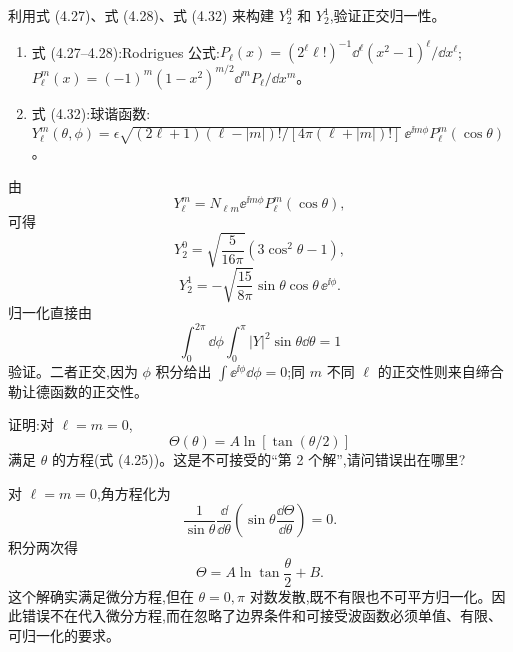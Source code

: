 \begin{question}
利用式 (4.27)、式 (4.28)、式 (4.32) 来构建 $Y_2^0$ 和 $Y_2^1$,验证正交归一性。

\par\smallskip
{}
\begin{enumerate}[leftmargin=2.2em,itemsep=0.12em,topsep=0.12em,parsep=0pt]
\item 式 (4.27--4.28):Rodrigues 公式:$P_\ell(x)=(2^\ell\ell!)^{-1}\dd^\ell(x^2-1)^\ell/\dd x^\ell$;$P_\ell^m(x)=(-1)^m(1-x^2)^{m/2}\dd^mP_\ell/\dd x^m$。
\item 式 (4.32):球谐函数:$Y_\ell^m(\theta,\phi)=\epsilon\sqrt{(2\ell+1)(\ell-|m|)!/[4\pi(\ell+|m|)!]}\,\ee^{\ii m\phi}P_\ell^m(\cos\theta)$。
\end{enumerate}

\begin{solution}

由
\[
Y_\ell^m=N_{\ell m}\ee^{\ii m\phi}P_\ell^m(\cos\theta),
\]
可得
\[
Y_2^0=\sqrt{\frac{5}{16\pi}}(3\cos^2\theta-1),
\]
\[
Y_2^1=-\sqrt{\frac{15}{8\pi}}\sin\theta\cos\theta\,\ee^{\ii\phi}.
\]
归一化直接由
\[
\int_0^{2\pi}\!\dd\phi\int_0^\pi |Y|^2\sin\theta\dd\theta=1
\]
验证。二者正交,因为 $\phi$ 积分给出 $\int \ee^{\ii\phi}\dd\phi=0$;同 $m$ 不同 $\ell$ 的正交性则来自缔合勒让德函数的正交性。

\end{solution}
\end{question}

\begin{question}
证明:对 $\ell=m=0$,
\[
\Theta(\theta)=A\ln[\tan(\theta/2)]
\]
满足 $\theta$ 的方程(式 (4.25))。这是不可接受的“第 2 个解”,请问错误出在哪里?

\par\smallskip
{}

\begin{solution}

对 $\ell=m=0$,角方程化为
\[
\frac{1}{\sin\theta}\frac{\dd}{\dd\theta}\left(\sin\theta\frac{\dd\Theta}{\dd\theta}\right)=0.
\]
积分两次得
\[
\Theta=A\ln\tan\frac{\theta}{2}+B.
\]
这个解确实满足微分方程,但在 $\theta=0,\pi$ 对数发散,既不有限也不可平方归一化。因此错误不在代入微分方程,而在忽略了边界条件和可接受波函数必须单值、有限、可归一化的要求。

\end{solution}
\end{question}

